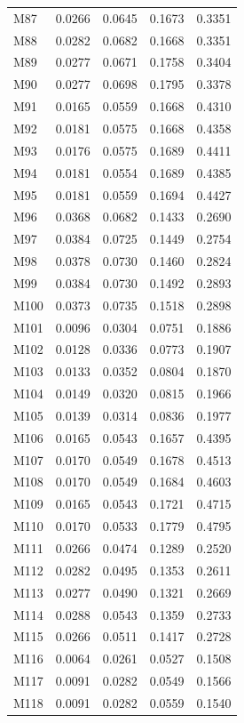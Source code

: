 \begin{longtable}{lrrrr}
M87 & 0.0266 & 0.0645 & 0.1673 & 0.3351 \\
M88 & 0.0282 & 0.0682 & 0.1668 & 0.3351 \\
M89 & 0.0277 & 0.0671 & 0.1758 & 0.3404 \\
M90 & 0.0277 & 0.0698 & 0.1795 & 0.3378 \\
M91 & 0.0165 & 0.0559 & 0.1668 & 0.4310 \\
M92 & 0.0181 & 0.0575 & 0.1668 & 0.4358 \\
M93 & 0.0176 & 0.0575 & 0.1689 & 0.4411 \\
M94 & 0.0181 & 0.0554 & 0.1689 & 0.4385 \\
M95 & 0.0181 & 0.0559 & 0.1694 & 0.4427 \\
M96 & 0.0368 & 0.0682 & 0.1433 & 0.2690 \\
M97 & 0.0384 & 0.0725 & 0.1449 & 0.2754 \\
M98 & 0.0378 & 0.0730 & 0.1460 & 0.2824 \\
M99 & 0.0384 & 0.0730 & 0.1492 & 0.2893 \\
M100 & 0.0373 & 0.0735 & 0.1518 & 0.2898 \\
M101 & 0.0096 & 0.0304 & 0.0751 & 0.1886 \\
M102 & 0.0128 & 0.0336 & 0.0773 & 0.1907 \\
M103 & 0.0133 & 0.0352 & 0.0804 & 0.1870 \\
M104 & 0.0149 & 0.0320 & 0.0815 & 0.1966 \\
M105 & 0.0139 & 0.0314 & 0.0836 & 0.1977 \\
M106 & 0.0165 & 0.0543 & 0.1657 & 0.4395 \\
M107 & 0.0170 & 0.0549 & 0.1678 & 0.4513 \\
M108 & 0.0170 & 0.0549 & 0.1684 & 0.4603 \\
M109 & 0.0165 & 0.0543 & 0.1721 & 0.4715 \\
M110 & 0.0170 & 0.0533 & 0.1779 & 0.4795 \\
M111 & 0.0266 & 0.0474 & 0.1289 & 0.2520 \\
M112 & 0.0282 & 0.0495 & 0.1353 & 0.2611 \\
M113 & 0.0277 & 0.0490 & 0.1321 & 0.2669 \\
M114 & 0.0288 & 0.0543 & 0.1359 & 0.2733 \\
M115 & 0.0266 & 0.0511 & 0.1417 & 0.2728 \\
M116 & 0.0064 & 0.0261 & 0.0527 & 0.1508 \\
M117 & 0.0091 & 0.0282 & 0.0549 & 0.1566 \\
M118 & 0.0091 & 0.0282 & 0.0559 & 0.1540 \\

\end{longtable}

